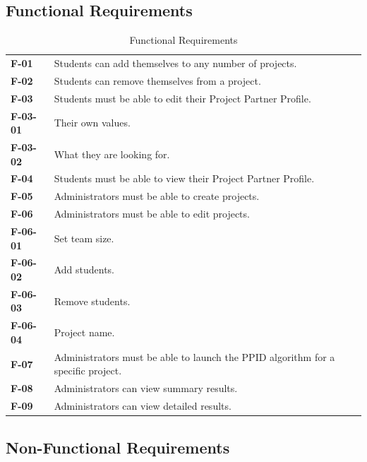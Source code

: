 \documentclass[12pt,letterpaper]{article}
\begin{document}
\subsection{Functional Requirements}

\begin{table}[H]
\caption{Functional Requirements}
\renewcommand{\arraystretch}{1.5}
\everyrow{\hline}
\begin{tabu} to 
F-01 & Students can add themselves to any number of projects. \\
F-02 & Students can remove themselves from a project. \\
F-03 & Students must be able to edit their Project Partner Profile. \\
\hspace{1 pc}F-03-01 & \hspace{2 pc}Their own values. \\
\hspace{1 pc}F-03-02 & \hspace{2 pc}What they are looking for. \\
F-04 & Students must be able to view their Project Partner Profile. \\
F-05 & Administrators must be able to create projects. \\
F-06 & Administrators must be able to edit projects. \\
\hspace{1 pc}F-06-01 & \hspace{2 pc}Set team size. \\
\hspace{1 pc}F-06-02 & \hspace{2 pc}Add students. \\
\hspace{1 pc}F-06-03 & \hspace{2 pc}Remove students. \\
\hspace{1 pc}F-06-04 & \hspace{2 pc}Project name. \\
F-07 & Administrators must be able to launch the PPID algorithm for a specific project. \\
F-08 & Administrators can view summary results. \\
F-09 & Administrators can view detailed results.
\end{tabu}
\end{table}

\subsection{Non-Functional Requirements}
\end{document}
